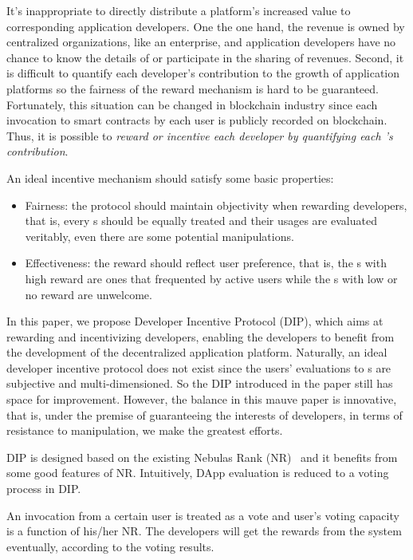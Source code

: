 It's inappropriate to directly distribute a platform's increased value to
corresponding application developers. One the one hand, the revenue is owned by
centralized organizations, like an enterprise, and application developers have
no chance to know the details of or participate in the sharing of revenues. Second, it
is difficult to quantify each developer's contribution to the growth of
application platforms so the fairness of the reward mechanism is hard to be guaranteed. Fortunately, this situation can be changed in blockchain
industry since each invocation to smart contracts by each user is
publicly recorded on blockchain. Thus, it is possible to \emph{reward or incentive each \dapp developer by
quantifying each \dapp's contribution}.

An ideal incentive mechanism should satisfy some basic properties:
\begin{itemize}

\item Fairness: the protocol should maintain objectivity when rewarding developers, that is, every {\dapp}s should be equally treated and their usages are evaluated veritably, even there are some potential manipulations.

\item Effectiveness: the reward should reflect user preference, that is, the {\dapp}s with high reward are ones that frequented by active users while the {\dapp}s with low or no reward are unwelcome.
\end{itemize}


In this paper, we propose Developer Incentive Protocol (DIP), which aims at rewarding and incentivizing  developers, enabling the developers to benefit from the development of the decentralized application platform. Naturally, an ideal developer incentive protocol does not exist since the users' evaluations to  {\dapp}s are subjective and multi-dimensioned. So the DIP introduced in the paper still has space for improvement. However, the balance in this mauve paper is innovative, that is, under the premise of guaranteeing the interests of \dapp developers, in terms of resistance to manipulation, we make the greatest efforts.

DIP is designed based on the existing Nebulas Rank
(NR)~\cite{Nebulasyellowpaper} and it benefits from some good features of NR\@.
Intuitively, DApp evaluation is reduced to a voting process in DIP\@.

An invocation from a certain user is treated as a vote and user's voting
capacity is a function of his/her NR\@. The developers will get the rewards from the system eventually, according to the voting results.


